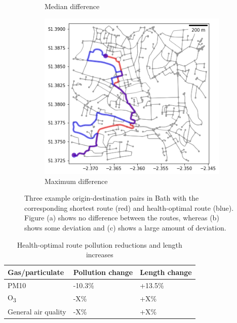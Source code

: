 \documentclass[11pt]{report}
\begin{document}
\begin{figure}[!tb]
\begin{minipage}{1\linewidth}
\begin{subfigure}[t]{.5\linewidth}
            	\caption{Median difference}
            	\label{fig:route_median}
	   \end{subfigure}
        \end{minipage}
    \begin{minipage}{1\linewidth}
    	\centering
        \begin{subfigure}[t]{.5\linewidth}
            \includegraphics[width=\textwidth]{images/health_optimal_route_max}
            \caption{Maximum difference}
            \label{fig:route_max}
        \end{subfigure}
    \end{minipage}
    \caption[Example routes.]{Three example origin-destination pairs in Bath with the corresponding shortest route (red) and health-optimal route (blue). Figure (a) shows no difference between the routes, whereas (b) shows some deviation and (c) shows a large amount of deviation.}
    \label{fig:origdestpairs}
\end{figure}

\begin{table}[!tbp]
  \centering
  \caption{Health-optimal route pollution reductions and length increases}
  \label{tab:pollution_reductions}
  \begin{tabular}{ l l l }
  \toprule
  Gas/particulate & Pollution change & Length change \\ \midrule
  PM10 & -10.3\% & +13.5\% \\
  O\textsubscript{3} & -X\% & +X\% \\
  General air quality & -X\% & +X\% \\ \bottomrule
  \end{tabular}
\end{table}
\end{document}
